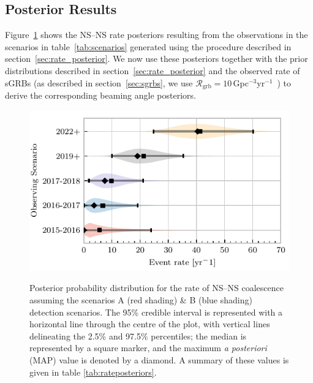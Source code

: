 \documentclass[twocolumn,nofootinbib]{revtex4-1}
\newcommand{\grbrate}{{{\mathcal R}_{\mathrm{grb}}}}
\newcommand{\cbcrate}{{{\mathcal R}}}
\newcommand{\latin}[1]{\textit{#1}}
\newcommand{\BNS}{\ac{NS}--\ac{NS}\xspace}
\begin{document}
\subsection{Posterior Results}
Figure~\ref{fig:aligorate} shows the \BNS rate posteriors resulting from
the observations in the scenarios in table~\ref{tab:scenarios}
generated using the procedure described in
section~\ref{sec:rate_posterior}.
We now use these posteriors together with the prior distributions
described in section~\ref{sec:rate_posterior} and the observed rate of
\acp{sGRB} (as described in section~\ref{sec:sgrbs}, we use
$\grbrate=10$\,Gpc$^{-3}$yr$^{-1}$~\cite{Nakar:2007yr,Dietz:2010eh})
to derive the corresponding beaming angle posteriors.

\begin{figure}
\centering
{\includegraphics[width=\linewidth]{rate_posteriors_violin.pdf}}
\caption{Posterior probability distribution for the rate of \BNS
  coalescence assuming the scenarios A (red shading) \& B (blue
  shading) detection scenarios. The 95\% credible interval is
  represented with a horizontal line through the centre of the plot,
  with vertical lines delineating the 2.5\% and 97.5\% percentiles;
  the median is represented by a square marker, and the maximum
  \latin{a posteriori} (\ac{MAP}) value is denoted by a diamond. A
  summary of these values is given in table
  \ref{tab:rateposteriors}. \label{fig:aligorate} }
\end{figure}
\end{document}
